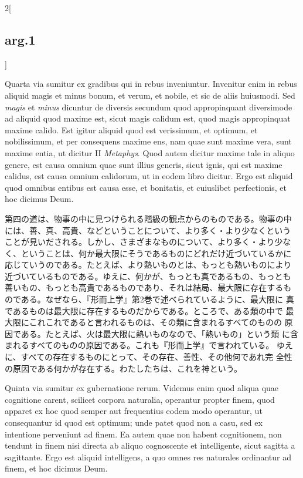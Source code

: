 \documentclass[paper=a4paper,fontsize=10pt,jafontsize=9pt,titlepage]{jlreq}
\begin{document}
\begin{paracol}{2}[\subsection{arg.1}]
\switchcolumn*

Quarta via sumitur ex gradibus qui in rebus inveniuntur. Invenitur
enim in rebus aliquid magis et minus bonum, et verum, et nobile, et
sic de aliis huiusmodi. Sed {\itshape magis} et {\itshape minus} dicuntur de
diversis secundum quod appropinquant diversimode ad aliquid quod
maxime est, sicut magis calidum est, quod magis appropinquat maxime
calido. Est igitur aliquid quod est verissimum, et optimum, et
nobilissimum, et per consequens maxime ens, nam quae sunt maxime vera,
sunt maxime entia, ut dicitur II {\itshape Metaphys}. Quod autem dicitur
maxime tale in aliquo genere, est causa omnium quae sunt illius
generis, sicut ignis, qui est maxime calidus, est causa omnium
calidorum, ut in eodem libro dicitur. Ergo est aliquid quod omnibus
entibus est causa esse, et bonitatis, et cuiuslibet perfectionis, et
hoc dicimus Deum.

\switchcolumn

第四の道は、物事の中に見つけられる階級の観点からのものである。物事の中
には、善、真、高貴、などということについて、より多く・より少なくという
ことが見いだされる。しかし、さまざまなものについて、より多く・より少な
く、ということは、何か最大限にそうであるものにどれだけ近づいているかに
応じていうのである。たとえば、より熱いものとは、もっとも熱いものにより
近づいているものである。ゆえに、何かが、もっとも真であるもの、もっとも
善いもの、もっとも高貴であるものであり、それは結局、最大限に存在するも
のである。なぜなら、『形而上学』第2巻で述べられているように、最大限に
真であるものは最大限に存在するものだからである。ところで、ある類の中で
最大限にこれこれであると言われるものは、その類に含まれるすべてのものの
原因である。たとえば、火は最大限に熱いものなので、「熱いもの」という類
に含まれるすべてのものの原因である。これも『形而上学』で言われている。
ゆえに、すべての存在するものにとって、その存在、善性、その他何であれ完
全性の原因である何かが存在する。わたしたちは、これを神という。

\switchcolumn*

Quinta via sumitur ex gubernatione rerum. Videmus enim quod aliqua
quae cognitione carent, scilicet corpora naturalia, operantur propter
finem, quod apparet ex hoc quod semper aut frequentius eodem modo
operantur, ut consequantur id quod est optimum; unde patet quod non a
casu, sed ex intentione perveniunt ad finem. Ea autem quae non habent
cognitionem, non tendunt in finem nisi directa ab aliquo cognoscente
et intelligente, sicut sagitta a sagittante. Ergo est aliquid
intelligens, a quo omnes res naturales ordinantur ad finem, et hoc
dicimus Deum.


\end{paracol}
\end{document}
